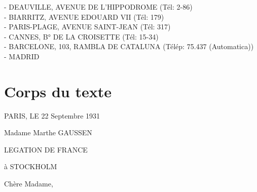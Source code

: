\documentclass[12pt,a4paper]{article}
\begin{document}
- DEAUVILLE, AVENUE DE L'HIPPODROME (Tél: 2-86)\\
- BIARRITZ, AVENUE EDOUARD VII (Tél: 179)\\
- PARIS-PLAGE, AVENUE SAINT-JEAN (Tél: 317)\\
- CANNES, B° DE LA CROISETTE (Tél: 15-34)\\
- BARCELONE, 103, RAMBLA DE CATALUNA (Télép: 75.437 (Automatica))\\
- MADRID\\

\section{Corps du texte}

\begin{flushright}PARIS, LE 22 Septembre 1931

Madame Marthe GAUSSEN

LEGATION DE FRANCE

à STOCKHOLM

\end{flushright}

Chère Madame,
\end{document}
